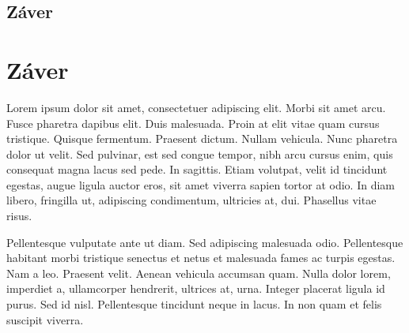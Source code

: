 \newpage
{}
{
	\section{Záver}
}
{
	\chapter{Záver}
}
Lorem ipsum dolor sit amet, consectetuer adipiscing elit. Morbi sit amet arcu. Fusce pharetra dapibus elit. Duis malesuada. Proin at elit vitae quam cursus tristique. Quisque fermentum. Praesent dictum. Nullam vehicula. Nunc pharetra dolor ut velit. Sed pulvinar, est sed congue tempor, nibh arcu cursus enim, quis consequat magna lacus sed pede. In sagittis. Etiam volutpat, velit id tincidunt egestas, augue ligula auctor eros, sit amet viverra sapien tortor at odio. In diam libero, fringilla ut, adipiscing condimentum, ultricies at, dui. Phasellus vitae risus.

Pellentesque vulputate ante ut diam. Sed adipiscing malesuada odio. Pellentesque habitant morbi tristique senectus et netus et malesuada fames ac turpis egestas. Nam a leo. Praesent velit. Aenean vehicula accumsan quam. Nulla dolor lorem, imperdiet a, ullamcorper hendrerit, ultrices at, urna. Integer placerat ligula id purus. Sed id nisl. Pellentesque tincidunt neque in lacus. In non quam et felis suscipit viverra.